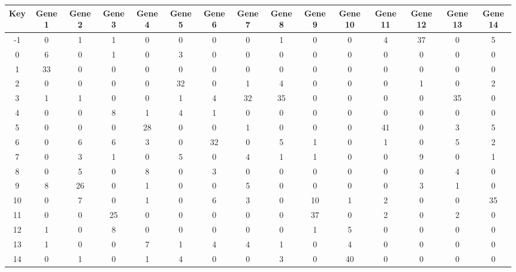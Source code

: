 \begin{tabular}{|c|c|c|c|c|c|c|c|c|c|c|c|c|c|c|}
\hline
Key & Gene 1 & Gene 2 & Gene 3 & Gene 4 & Gene 5 & Gene 6 & Gene 7 & Gene 8 & Gene 9 & Gene 10 & Gene 11 & Gene 12 & Gene 13 & Gene 14 \\
\hline
-1 & 0 & 1 & 1 & 0 & 0 & 0 & 0 & 1 & 0 & 0 & 4 & 37 & 0 & 5 \\
0 & 6 & 0 & 1 & 0 & 3 & 0 & 0 & 0 & 0 & 0 & 0 & 0 & 0 & 0 \\
1 & 33 & 0 & 0 & 0 & 0 & 0 & 0 & 0 & 0 & 0 & 0 & 0 & 0 & 0 \\
2 & 0 & 0 & 0 & 0 & 32 & 0 & 1 & 4 & 0 & 0 & 0 & 1 & 0 & 2 \\
3 & 1 & 1 & 0 & 0 & 1 & 4 & 32 & 35 & 0 & 0 & 0 & 0 & 35 & 0 \\
4 & 0 & 0 & 8 & 1 & 4 & 1 & 0 & 0 & 0 & 0 & 0 & 0 & 0 & 0 \\
5 & 0 & 0 & 0 & 28 & 0 & 0 & 1 & 0 & 0 & 0 & 41 & 0 & 3 & 5 \\
6 & 0 & 6 & 6 & 3 & 0 & 32 & 0 & 5 & 1 & 0 & 1 & 0 & 5 & 2 \\
7 & 0 & 3 & 1 & 0 & 5 & 0 & 4 & 1 & 1 & 0 & 0 & 9 & 0 & 1 \\
8 & 0 & 5 & 0 & 8 & 0 & 3 & 0 & 0 & 0 & 0 & 0 & 0 & 4 & 0 \\
9 & 8 & 26 & 0 & 1 & 0 & 0 & 5 & 0 & 0 & 0 & 0 & 3 & 1 & 0 \\
10 & 0 & 7 & 0 & 1 & 0 & 6 & 3 & 0 & 10 & 1 & 2 & 0 & 0 & 35 \\
11 & 0 & 0 & 25 & 0 & 0 & 0 & 0 & 0 & 37 & 0 & 2 & 0 & 2 & 0 \\
12 & 1 & 0 & 8 & 0 & 0 & 0 & 0 & 0 & 1 & 5 & 0 & 0 & 0 & 0 \\
13 & 1 & 0 & 0 & 7 & 1 & 4 & 4 & 1 & 0 & 4 & 0 & 0 & 0 & 0 \\
14 & 0 & 1 & 0 & 1 & 4 & 0 & 0 & 3 & 0 & 40 & 0 & 0 & 0 & 0 \\
\hline
\end{tabular}